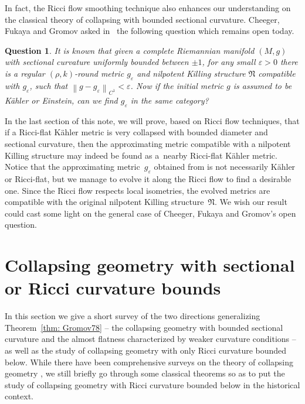 \documentclass[10pt,a4paper]{amsart}
\numberwithin{equation}{section}
\newtheorem{Question}[Theorem]{Question}
\begin{document}
In fact, the Ricci flow smoothing technique also enhances our understanding on
the classical theory of collapsing with bounded sectional curvature. Cheeger,
Fukaya and Gromov asked in~\cite{CFG92} the following question which remains
open today.
\begin{Question}\label{qst: question}
It is known that given a complete Riemannian manifold $(M,g)$ with
sectional curvature uniformly bounded between $\pm 1$, for any small
$\varepsilon>0$ there is a regular $(\rho, k)$-round metric $g_{\varepsilon}$
and nilpotent Killing structure $\mathfrak{N}$ compatible with
$g_{\varepsilon}$, such that $\left\|g-g_{\varepsilon}\right\|_{C^1}<
\varepsilon$. Now if the initial metric $g$ is assumed to be K\"ahler or
Einstein, can we find $g_{\varepsilon}$ in the same category?
\end{Question}
In the last section of this note, we will prove, based on Ricci flow techniques,
that if a Ricci-flat K\"ahler metric is very collapsed with bounded diameter and
sectional curvature, then the approximating metric compatible with a nilpotent
Killing structure may indeed be found as a~nearby Ricci-flat K\"ahler metric.
Notice that the approximating metric~$g_{\varepsilon}$ obtained from
\cite[Theorem~1.7]{CFG92} is not necessarily K\"ahler or Ricci-flat, but we
manage to evolve it along the Ricci flow to find a desirable one. Since the
Ricci flow respects local isometries, the evolved metrics are compatible with the
original nilpotent Killing structure~$\mathfrak{N}$. We wish our result could
cast some light on the general case of Cheeger, Fukaya and Gromov's open
question.

\section{Collapsing geometry with sectional or Ricci curvature bounds}\label{section2}
In this section we give a short survey of the two directions generalizing
 Theorem~\ref{thm: Gromov78} -- the collapsing geometry with bounded
sectional curvature and the almost flatness characterized by weaker curvature
conditions -- as well as the study of collapsing geometry with only Ricci
curvature bounded below. While there have been comprehensive surveys on
the theory of collapsing geometry \cite{Fukaya06, Rong07}, we still
briefly go through some classical theorems so as to put the study of collapsing
geometry with Ricci curvature bounded below in the historical context.
\end{document}
